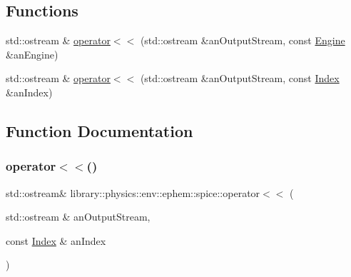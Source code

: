 \subsection*{Functions}
\begin{DoxyCompactItemize}
\item 
std\+::ostream \& \hyperlink{namespacelibrary_1_1physics_1_1env_1_1ephem_1_1spice_aca63ebc577208377f5e6e0dfd970417a}{operator$<$$<$} (std\+::ostream \&an\+Output\+Stream, const \hyperlink{classlibrary_1_1physics_1_1env_1_1ephem_1_1spice_1_1_engine}{Engine} \&an\+Engine)
\item 
std\+::ostream \& \hyperlink{namespacelibrary_1_1physics_1_1env_1_1ephem_1_1spice_ac579bfe92240f205e10a9e64ce5eb75d}{operator$<$$<$} (std\+::ostream \&an\+Output\+Stream, const \hyperlink{classlibrary_1_1physics_1_1env_1_1ephem_1_1spice_1_1_index}{Index} \&an\+Index)
\end{DoxyCompactItemize}


\subsection{Function Documentation}
\mbox{\label{namespacelibrary_1_1physics_1_1env_1_1ephem_1_1spice_ac579bfe92240f205e10a9e64ce5eb75d}} 
\subsubsection{\texorpdfstring{operator$<$$<$()}{operator<<()}\hspace{0.1cm}{\footnotesize\ttfamily [1/2]}}
{\footnotesize\ttfamily std\+::ostream\& library\+::physics\+::env\+::ephem\+::spice\+::operator$<$$<$ (\begin{DoxyParamCaption}\item[{std\+::ostream \&}]{an\+Output\+Stream,  }\item[{const \hyperlink{classlibrary_1_1physics_1_1env_1_1ephem_1_1spice_1_1_index}{Index} \&}]{an\+Index }\end{DoxyParamCaption})}


